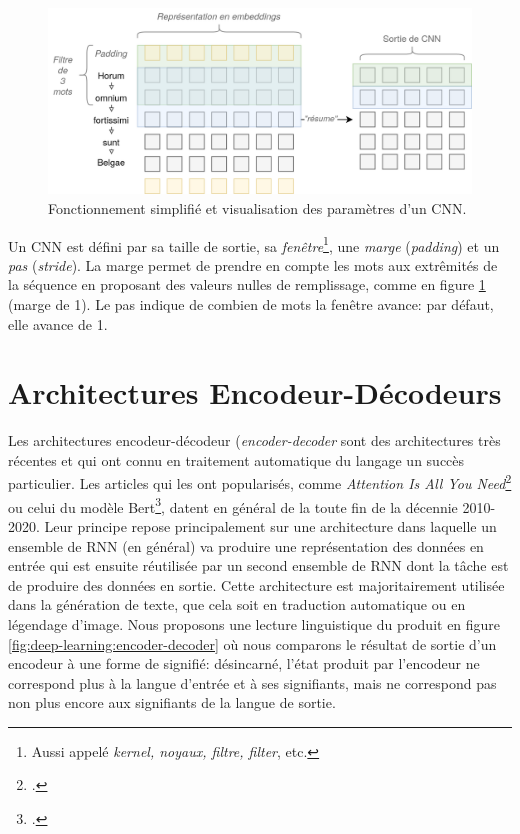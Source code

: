 \begin{figure}[h]
    \centering
    \includegraphics[width=\linewidth]{figures/chap2/CNN.png}
    \caption{Fonctionnement simplifié et visualisation des paramètres d'un CNN.}
    \label{fig:deep-learning:cnn-tal}
\end{figure}

Un CNN est défini par sa taille de sortie, sa \textit{fenêtre}\footnote{Aussi appelé \textit{kernel, noyaux, filtre, filter}, etc.}, une \textit{marge} (\textit{padding}) et un \textit{pas} (\textit{stride}). La marge permet de prendre en compte les mots aux extrêmités de la séquence en proposant des valeurs nulles de remplissage, comme en figure \ref{fig:deep-learning:cnn-tal} (marge de 1). Le pas indique de combien de mots la fenêtre avance: par défaut, elle avance de 1. 

\section{Architectures Encodeur-Décodeurs}
\label{deep-learning:encoder-decoder}

Les architectures encodeur-décodeur (\textit{encoder-decoder} sont des architectures très récentes et qui ont connu en traitement automatique du langage un succès particulier. Les articles qui les ont popularisés, comme \textit{Attention Is All You Need}\footcite{vaswani_attention_2017} ou celui du modèle Bert\footcite{devlin_bert_2019}, datent en général de la toute fin de la décennie 2010-2020. Leur principe repose principalement sur une architecture dans laquelle un ensemble de RNN (en général) va produire une représentation des données en entrée qui est ensuite réutilisée par un second ensemble de RNN dont la tâche est de produire des données en sortie. Cette architecture est majoritairement utilisée dans la génération de texte, que cela soit en traduction automatique ou en légendage d'image. Nous proposons une lecture linguistique du produit en figure \ref{fig:deep-learning:encoder-decoder} où nous comparons le résultat de sortie d'un encodeur à une forme de signifié: désincarné, l'état produit par l'encodeur ne correspond plus à la langue d'entrée et à ses signifiants, mais ne correspond pas non plus encore aux signifiants de la langue de sortie.

